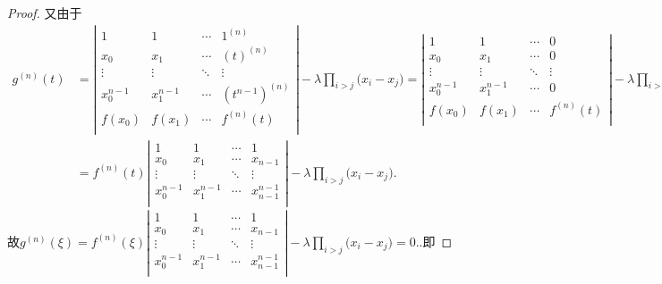 \documentclass[lang=cn,newtx,10pt,scheme=chinese]{elegantbook}
\begin{document}
\begin{proof}
    又由于
    \begin{align*}
        g^{\left( n \right)}\left( t \right) &=\left| \begin{matrix}
            1&		1&		\cdots&		1^{\left( n \right)}\\
            x_0&		x_1&		\cdots&		\left( t \right) ^{\left( n \right)}\\
            \vdots&		\vdots&		\ddots&		\vdots\\
            x_{0}^{n-1}&		x_{1}^{n-1}&		\cdots&		\left( t^{n-1} \right) ^{\left( n \right)}\\
            f(x_0)&		f(x_1)&		\cdots&		f^{\left( n \right)}(t)\\
        \end{matrix} \right|-\lambda \prod_{i>j}{(x_i}-x_j)=\left| \begin{matrix}
            1&		1&		\cdots&		0\\
            x_0&		x_1&		\cdots&		0\\
            \vdots&		\vdots&		\ddots&		\vdots\\
            x_{0}^{n-1}&		x_{1}^{n-1}&		\cdots&		0\\
            f(x_0)&		f(x_1)&		\cdots&		f^{\left( n \right)}(t)\\
        \end{matrix} \right|-\lambda \prod_{i>j}{(x_i}-x_j)
        \\
        &=f^{\left( n \right)}(t)\left| \begin{matrix}
            1&		1&		\cdots&		1\\
            x_0&		x_1&		\cdots&		x_{n-1}\\
            \vdots&		\vdots&		\ddots&		\vdots\\
            x_{0}^{n-1}&		x_{1}^{n-1}&		\cdots&		x_{n-1}^{n-1}\\
        \end{matrix} \right|-\lambda \prod_{i>j}{(x_i}-x_j).
        \nonumber
    \end{align*}
    故$g^{\left( n \right)}\left( \xi \right) =f^{\left( n \right)}(\xi )\left| \begin{matrix}
        1&		1&		\cdots&		1\\
        x_0&		x_1&		\cdots&		x_{n-1}\\
        \vdots&		\vdots&		\ddots&		\vdots\\
        x_{0}^{n-1}&		x_{1}^{n-1}&		\cdots&		x_{n-1}^{n-1}\\
    \end{matrix} \right|-\lambda \prod_{i>j}{(x_i}-x_j)=0.$.即

\end{proof}
\end{document}
